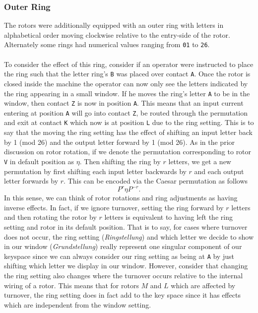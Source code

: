 \subsubsection{Outer Ring}

The rotors were additionally equipped with an outer ring with
letters in alphabetical order moving clockwise relative to the
entry-side of the rotor. Alternately some rings had numerical values
ranging from \texttt{01} to \texttt{26}.
\\\\To consider the effect of this ring,
consider if an operator were instructed to place the ring such that
the letter ring's \texttt{B} was placed over contact \texttt{A}. Once
the rotor is closed inside the machine
the operator can now only see the letters indicated by the ring
appearing in a small window. If he moves the ring's letter \texttt{A}
to be in the window, then contact \texttt{Z} is now in position
\texttt{A}. This means that an input current
entering at position \texttt{A} will go into contact \texttt{Z}, be
routed through the permutation and exit
at contact \texttt{K} which now is at position \texttt{L} due to the
ring setting. This is to say that the moving the ring
setting has the effect of shifting an input letter back by 1 (mod 26)
and the output letter forward by 1 (mod 26).
As in the prior discussion on rotor rotation, if we denote the
permutation corresponding to rotor \texttt{V} in default position as
$\eta$. Then shifting the ring by $r$ letters, we get a new
permutation by first shifting each input letter backwards by $r$ and
each output letter forwards by $r$. This can be encoded via the
Caesar permutation as follows
\[
	{P^{r}}\eta{P^{-r}}.
\]
In this sense, we can think of rotor rotations and ring adjustments
as having inverse effects. In fact, if we ignore turnover, setting
the ring forward by $r$ letters and then rotating the rotor by $r$
letters is equivalent to having left the ring setting and rotor in
its default position. That is to say, for cases where turnover does
not occur, the ring setting (\emph{Ringstellung}) and which letter
we decide to show in our window (\emph{Grundstellung}) really
represent one singular component of our keyspace since we can always
consider our ring setting as being at \texttt{A} by just shifting
which letter we display in our window.
However, consider that changing the ring
setting also changes where the turnover occurs relative to the
internal wiring of a rotor. This means that for rotors $M$ and $L$
which are affected by turnover, the ring setting does in fact add to
the key space since it has effects which are independent from the
window setting.

